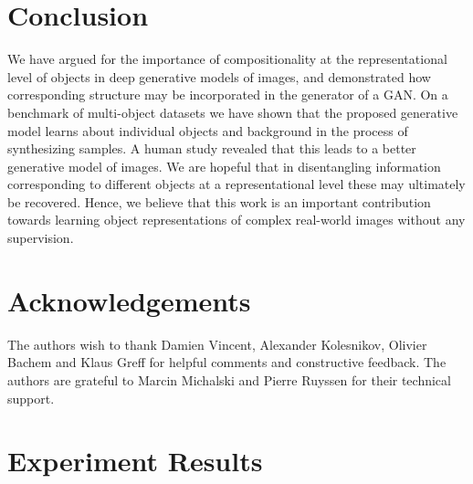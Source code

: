 \documentclass{article}
\begin{document}
\section{Conclusion}
We have argued for the importance of compositionality at the representational level of objects in deep generative models of images, and demonstrated how corresponding structure may be incorporated in the generator of a GAN.
On a benchmark of multi-object datasets we have shown that the proposed generative model learns about individual objects and background in the process of synthesizing samples.
A human study revealed that this leads to a better generative model of images.
We are hopeful that in disentangling information corresponding to different objects at a representational level these may ultimately be recovered.
Hence, we believe that this work is an important contribution towards learning object representations of complex real-world images without any supervision.

\section*{Acknowledgements}

The authors wish to thank Damien Vincent, Alexander Kolesnikov, Olivier Bachem and Klaus Greff for helpful comments and
constructive feedback.
The authors are grateful to Marcin Michalski and Pierre Ruyssen for their technical support.





\newpage
\appendix

\section{Experiment Results}
\label{app:experiment_results}
\end{document}
